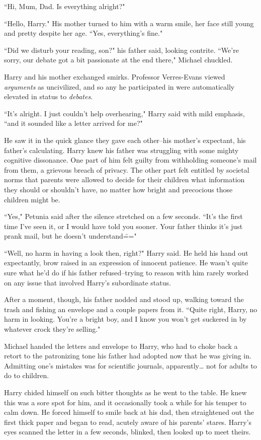 ``Hi, Mum, Dad. Is everything alright?"

``Hello, Harry." His mother turned to him with a warm smile, her face still young and pretty despite her age. ``Yes, everything's fine."

``Did we disturb your reading, son?" his father said, looking contrite. ``We're sorry, our debate got a bit passionate at the end there," Michael chuckled.

Harry and his mother exchanged smirks. Professor Verres-Evans viewed \emph{arguments} as uncivilized, and so any he participated in were automatically elevated in status to \emph{debates}.

``It's alright. I just couldn't help overhearing," Harry said with mild emphasis, ``and it sounded like a letter arrived for me?"

He saw it in the quick glance they gave each other\---his mother's expectant, his father's calculating. Harry knew his father was struggling with some mighty cognitive dissonance. One part of him felt guilty from withholding someone's mail from them, a grievous breach of privacy. The other part felt entitled by societal norms that parents were allowed to decide for their children what information they should or shouldn't have, no matter how bright and precocious those children might be.

``Yes," Petunia said after the silence stretched on a few seconds. ``It's the first time I've seen it, or I would have told you sooner. Your father thinks it's just prank mail, but he doesn't understand\==="

``Well, no harm in having a look then, right?" Harry said. He held his hand out expectantly, brow raised in an expression of innocent patience. He wasn't quite sure what he'd do if his father refused\---trying to reason with him rarely worked on any issue that involved Harry's subordinate status.

After a moment, though, his father nodded and stood up, walking toward the trash and fishing an envelope and a couple papers from it. ``Quite right, Harry, no harm in looking. You're a bright boy, and I know you won't get suckered in by whatever crock they're selling."

Michael handed the letters and envelope to Harry, who had to choke back a retort to the patronizing tone his father had adopted now that he was giving in. Admitting one's mistakes was for scientific journals, apparently{\ldots} not for adults to do to children.

Harry chided himself on such bitter thoughts as he went to the table. He knew this was a sore spot for him, and it occasionally took a while for his temper to calm down. He forced himself to smile back at his dad, then straightened out the first thick paper and began to read, acutely aware of his parents' stares. Harry's eyes scanned the letter in a few seconds, blinked, then looked up to meet theirs.

